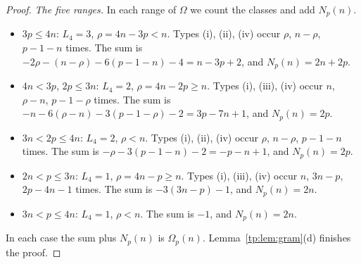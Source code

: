 \documentclass[11pt]{amsart}
\theoremstyle{definition}
\theoremstyle{remark}
\numberwithin{equation}{section}
\begin{document}
\begin{proof}
\emph{The five ranges.} In each range of $\Omega$ we count the classes and add $N_p(n)$.
\begin{itemize}[leftmargin=*]
\item $3p\le4n$: $L_4=3$, $\rho=4n-3p<n$. Types (i), (ii), (iv) occur $\rho$, $n-\rho$, $p-1-n$ times. The sum is
 $-2\rho-(n-\rho)-6(p-1-n)-4=n-3p+2$, and $N_p(n)=2n+2p$.
\item $4n<3p$, $2p\le3n$: $L_4=2$, $\rho=4n-2p\ge n$. Types (i), (iii), (iv) occur $n$, $\rho-n$, $p-1-\rho$ times. The
 sum is $-n-6(\rho-n)-3(p-1-\rho)-2=3p-7n+1$, and $N_p(n)=2p$.
\item $3n<2p\le4n$: $L_4=2$, $\rho<n$. Types (i), (ii), (iv) occur $\rho$, $n-\rho$, $p-1-n$ times. The sum is
 $-\rho-3(p-1-n)-2=-p-n+1$, and $N_p(n)=2p$.
\item $2n<p\le3n$: $L_4=1$, $\rho=4n-p\ge n$. Types (i), (iii), (iv) occur $n$, $3n-p$, $2p-4n-1$ times. The sum is
 $-3(3n-p)-1$, and $N_p(n)=2n$.
\item $3n<p\le4n$: $L_4=1$, $\rho<n$. The sum is $-1$, and $N_p(n)=2n$.
\end{itemize}
In each case the sum plus $N_p(n)$ is $\Omega_p(n)$. Lemma~\ref{tp:lem:gram}(d) finishes the proof.
\end{proof}
\end{document}
